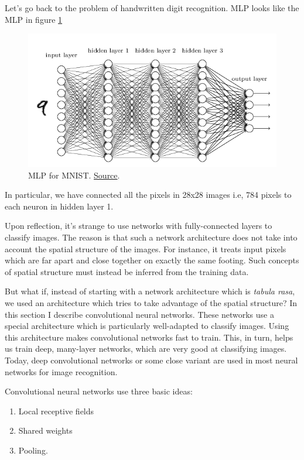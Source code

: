 \documentclass[a4paper]{tufte-handout}
\begin{document}
Let's go back to the problem of handwritten digit recognition. MLP looks
like the MLP in figure \ref{fig:mnistmlp}

\begin{figure}
  \includegraphics[width=\linewidth]{mnist_net.png}
  \caption{MLP for MNIST.
  \href{http://neuralnetworksanddeeplearning.com/chap5.html\%22}{Source}.}
  \label{fig:mnistmlp}
\end{figure}


In particular, we have connected all the pixels in 28x28 images i.e, 784
pixels to each neuron in hidden layer 1.

Upon reflection, it's strange to use networks with fully-connected
layers to classify images. The reason is that such a network
architecture does not take into account the spatial structure of the
images. For instance, it treats input pixels which are far apart and
close together on exactly the same footing. Such concepts of spatial
structure must instead be inferred from the training data.

But what if, instead of starting with a network architecture which is
\emph{tabula rasa}, we used an architecture which tries to take
advantage of the spatial structure? In this section I describe
convolutional neural networks. These networks use a special architecture
which is particularly well-adapted to classify images. Using this
architecture makes convolutional networks fast to train. This, in turn,
helps us train deep, many-layer networks, which are very good at
classifying images. Today, deep convolutional networks or some close
variant are used in most neural networks for image recognition.

Convolutional neural networks use three basic ideas:

\begin{enumerate}
\item
  Local receptive fields
\item
  Shared weights
\item
  Pooling.
\end{enumerate}
\end{document}
